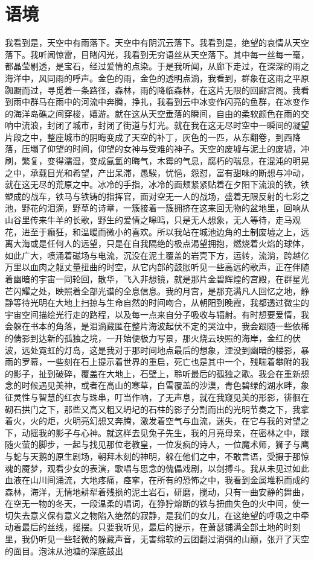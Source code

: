 \documentclass[UTF8]{article}
\begin{document}
\section{语境}
\par 我看到是，天空中有雨落下。天空中有阴沉云落下。我看到是，绝望的哀情从天空落下。我听闻惊雷，目睹闪光，我看到无穷语丝从天空落下。其中每一丝每一毫，都晶莹剔透，是宝石，经过爱情的点染。于是我听闻，从廊下走过，在深深的雨之海洋中，风同雨的呼声。金色的雨，金色的透明点滴，我看到，群象在这雨之平原踟蹰而过，寻觅着一条路径，森林，雨的降临森林，在这片无限的回廊宫阁。我看到雨中群马在雨中的河流中奔腾，挣扎，我看到云中冰变作闪亮的鱼群，在冰变作的海洋岛礁之间穿梭，嬉游。就在这从天空垂落的瞬间，自由的柔软颜色在雨的交响中流浪，封闭了城市，封闭了街道与灯光。就在我在这无尽时空中一瞬间的凝望片段之中，整座城市的阴晦变成了天空的补丁，灰色的一匹，从东翻卷，到西降落，压塌了仰望的时间，仰望的女神与受难的神子。天空的废墟与泥土的废墟，冲刷，繁复，变得濡湿，变成氤氲的晦气，木霉的气息，腐朽的喘息，在混沌的明晃之中，承载目光和希望，产出呆滞，愚騃，忧悒，怨怼，富有甜味的断想与冲动，就在这无尽的荒原之中。冰冷的手指，冰冷的面颊紧紧贴着在夕阳下流浪的铁，铁塑成的战车，铁马与铁铸的指挥官，面对空无一人的战场，盛着无限反射的七彩之池，野花的泪滴，野草的诗章，一簇接着一簇拥挤在这来回无物的盆地里，回响从山谷里传来牛羊的长歌，野生的爱情之嗥鸣，只是无人想象，无人等待，走马观花，进至于癫狂，和温暖而微小的喜欢。所以我站在城池边角的土制废墟之上，远离大海或是任何人的远望，只是在自我隔绝的极点渴望拥抱，燃烧着火焰的球体，如此广大，喷涌着磁场与电流，沉没在泥土覆盖的岩壳下方，运转，流淌，跨越亿万里以血肉之躯丈量扭曲的时空，从它内部的鼓胀听见一些高远的歌声，正在伴随着幽暗的宇宙一同轮回，散华，飞入非想镜，就是那片金碧辉煌的宫殿，在群星光芒闪耀之处，映照着全部光谱的全息信息。我的月宫，是那充满凡人回忆之地，静静等待光明在大地上扫掠与生命自然的时间吻合，从朝阳到晚霞，我都透过微尘的宇宙空间描绘光行走的路程，以及每一点来自分子吸收与辐射。有时想要爱情，我会躲在书本的角落，是泪滴藏匿在整片海波起伏不定的哭泣中，我会跟随一些依稀的倩影到达新的孤独之境，一开始便极力写景，那火烧云映照的海岸，金红的伏波，远处霓虹的灯岛，这是我对于那时间地点最后的想象，湮没到幽暗的楼影，暴雨的罗幕，一些刻在石上提示着世界的重启，死亡也是其中一个，残喘着攀附的我的影子，扯到破碎，覆盖在大地上，石壁上，聆听最后的孤独之歌。我会在重新想念的时候遇见美神，或者在高山的寒草，白雪覆盖的沙漠，青色碧绿的湖水畔，象征灵性与智慧的红衣与珠串，叮当作响，了无声息，就在我窥见美的形影，徘徊在砌石拱门之下，那些又高又粗又坍圮的石柱的影子分割而出的光明节奏之下，我拿着火，火的炬，火明亮幻想又奔腾，激发着空气与血流，迷失，在它与我的对望之下，动摇我的影子与心神。就这样去见兔子先生，我的月亮母亲，在密林之中，跟随火萤的脚步，一起与找见那位老教皇，一位发疯的诗人，一位魔术师，狮子与鹰与蛇与天鹅的原生剧场，朝拜木刻的神明，躲在他们之中，不敢言语，受摄于那惊魂的魇梦，观看少女的表演，歌唱与思念的傀儡戏剧，以剑搏斗。我从未见过如此血液在山川间涌流，大地疼痛，痉挛，在所有的恐怖之中，我看到金属堆积而成的森林，海洋，无情地耕犁着残损的泥土岩石，研磨，搅动，只有一曲安静的舞曲，在空无一物的冬天，一段温柔的唱词，在狰狞熔断的铁与扭曲失色的火中间，使一切失去意义保有意义之物陷入绝然的寂静，是我们的女儿，在这绝望的呼吸之中牵动着最后的丝线，摇摆。只要我听见，最后的提示，在萧瑟铺满全部土地的时刻里，我仍听见一些轻微的躲藏声音，无害绵软的云团翻过消弭的山巅，张开了天空的面目。泡沫从池塘的深底鼓出
\end{document}
